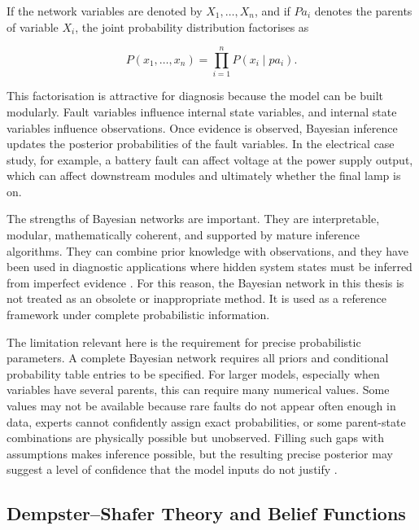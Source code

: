 \documentclass[runningheads]{llncs}
\begin{document}
If the network variables are denoted by $X_1, \ldots, X_n$, and if $Pa_i$ denotes the parents of variable $X_i$, the joint probability distribution factorises as

\begin{equation}
P(x_1, \ldots, x_n) = \prod_{i=1}^{n} P(x_i \mid pa_i).
\label{eq:bn_factorisation}
\end{equation}

This factorisation is attractive for diagnosis because the model can be built modularly. Fault variables influence internal state variables, and internal state variables influence observations. Once evidence is observed, Bayesian inference updates the posterior probabilities of the fault variables. In the electrical case study, for example, a battery fault can affect voltage at the power supply output, which can affect downstream modules and ultimately whether the final lamp is on.

The strengths of Bayesian networks are important. They are interpretable, modular, mathematically coherent, and supported by mature inference algorithms. They can combine prior knowledge with observations, and they have been used in diagnostic applications where hidden system states must be inferred from imperfect evidence \cite{LernerParrKollerBiswas2000,VerbertBabuskaDeSchutter2017}. For this reason, the Bayesian network in this thesis is not treated as an obsolete or inappropriate method. It is used as a reference framework under complete probabilistic information.

The limitation relevant here is the requirement for precise probabilistic parameters. A complete Bayesian network requires all priors and conditional probability table entries to be specified. For larger models, especially when variables have several parents, this can require many numerical values. Some values may not be available because rare faults do not appear often enough in data, experts cannot confidently assign exact probabilities, or some parent-state combinations are physically possible but unobserved. Filling such gaps with assumptions makes inference possible, but the resulting precise posterior may suggest a level of confidence that the model inputs do not justify \cite{Shenoy2023IncompleteBN}.

\subsection{Dempster--Shafer Theory and Belief Functions}
\label{sec:dempster_shafer_belief_functions}
\end{document}
